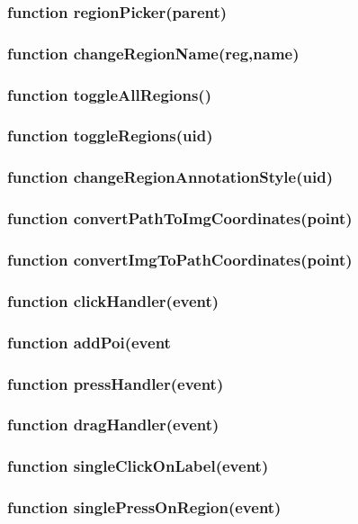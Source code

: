 \subsubsection{function regionPicker(parent)}
\subsubsection{function changeRegionName(reg,name)}
\subsubsection{function toggleAllRegions()}
\subsubsection{function toggleRegions(uid)}
\subsubsection{function changeRegionAnnotationStyle(uid)}
\subsubsection{function convertPathToImgCoordinates(point)}
\subsubsection{function convertImgToPathCoordinates(point)}
\subsubsection{function clickHandler(event)}
\subsubsection{function addPoi(event}
\subsubsection{function pressHandler(event)}
\subsubsection{function dragHandler(event)}
\subsubsection{function singleClickOnLabel(event)}
\subsubsection{function singlePressOnRegion(event)}
